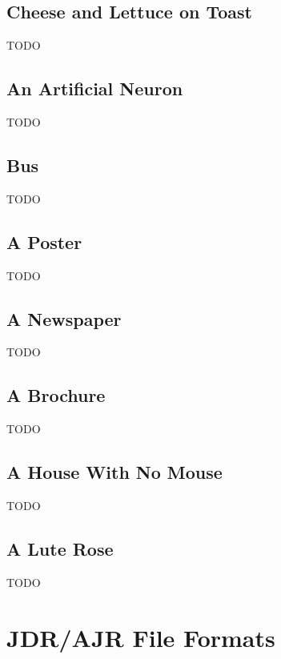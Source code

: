 \section{Cheese and Lettuce on Toast}\label{sec:cheeseexample}

TODO


\section{An Artificial Neuron}\label{sec:neuronexample}

TODO


\section{Bus}\label{sec:busexample}

TODO


\section{A Poster}\label{sec:postertutorial}

TODO


\section{A Newspaper}\label{sec:newstutorial}

TODO


\section{A Brochure}\label{sec:brochure}

TODO


\section{A House With No Mouse}\label{sec:accesstutorial}

TODO


\section{A Lute Rose}\label{sec:rosetutorial}

TODO


\chapter{JDR/AJR File Formats}\label{sec:jdrajrformat}

